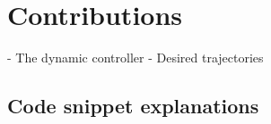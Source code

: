 \section{Contributions}\label{sec:4-contributions}

- The dynamic controller
- Desired trajectories

\subsection{Code snippet explanations}